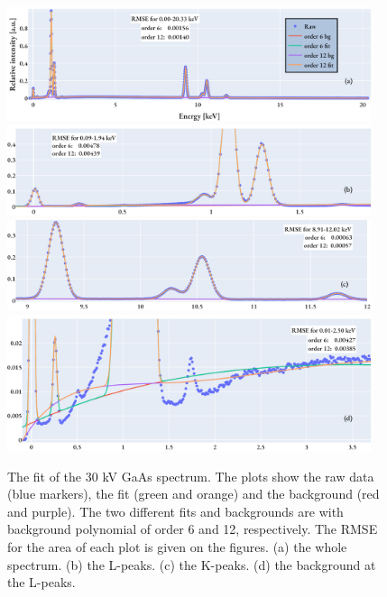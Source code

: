 
\begin{figure}[p]
    \centering
    \includegraphics[width=0.95\textwidth]{figures/fit/fit_GaAs30kV_whole.png}
    \includegraphics[width=0.95\textwidth]{figures/fit/fit_GaAs30kV_L.png}
    \includegraphics[width=0.95\textwidth]{figures/fit/fit_GaAs30kV_K.png}
    \includegraphics[width=0.95\textwidth]{figures/fit/fit_GaAs30kV_bg.png}
    \caption{
        The fit of the 30 kV GaAs spectrum.
        The plots show the raw data (blue markers), the fit (green and orange) and the background (red and purple).
        The two different fits and backgrounds are with background polynomial of order 6 and 12, respectively.
        The RMSE for the area of each plot is given on the figures.
        (a) the whole spectrum.
        (b) the L-peaks.
        (c) the K-peaks.
        (d) the background at the L-peaks.
    }
    \label{fig:results:fit_GaAs30kV}
\end{figure}

